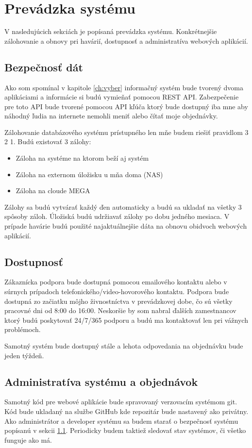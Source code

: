 \chapter{Prevádzka systému}

V nasledujúcich sekciách je popísaná prevádzka systému. Konkrétnejšie zálohovanie a obnovy pri havárií, dostupnosť a administratíva webových aplikácií.

\section{Bezpečnosť dát}
\label{sec}
Ako som spomínal v kapitole \ref{ch:vyber} informačný systém bude tvorený dvoma aplikáciami a informácie si budú vymieňať pomocou REST API. Zabezpečenie pre toto API bude tvorené pomocou API kľúča ktorý bude dostupný iba mne aby náhodný ľudia na internete nemohli meniť alebo čítať moje objednávky.

Zálohovanie databázového systému prístupného len mňe budem riešiť pravidlom 3 2 1. Budú existovať 3 zálohy:
\begin{itemize}
  \item Záloha na systéme na ktorom beží aj systém
  \item Záloha na externom úložisku u mňa doma (NAS)
  \item Záloha na cloude MEGA
\end{itemize}
Zálohy sa budú vytvárať každý ďen automaticky a budú sa ukladať na všetky 3 spôsoby záloh. Úložiská budú udržiavať zálohy po dobu jedného mesiaca. V prípade havárie budú použité najaktuálnejšie dáta na obnovu obidvoch webových aplikácií.


\section{Dostupnosť}

Zákaznícka podpora bude dostupná pomocou emailového kontaktu alebo v súrnych prípadoch telefonického/video-hovorového kontaktu. Podpora bude dostupná zo začiatku môjho živnostníctva v prevádzkovej dobe, čo sú všetky pracovné dni od 8:00 do 16:00. Neskoršie by som nabral ďalších zamestnancov ktorý budú poskytovať 24/7/365 podporu a budú ma kontaktovať len pri vážnych problémoch.

Samotný systém bude dostupný stále a lehota odpovedania na objednávku bude jeden týždeň.

\section{Administratíva systému a objednávok}

Samotný kód pre webové aplikácie bude spravovaný verzovacím systémom git. Kód bude ukladaný na službe GitHub kde repozitár bude nastavený ako privátny. Ako administrátor a developer systému sa budem starať o bezpečnosť systému popísanú v sekcii \ref{sec}. Periodicky budem taktiež sledovať stav systémov, či všetko funguje ako má.
